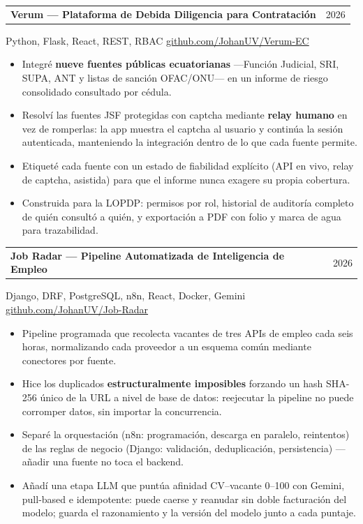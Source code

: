\documentclass[10.5pt,a4paper]{article}
\makeatletter
\newcommand{\entry}[2]{%
  \begin{tabularx}{\linewidth}{@{}Xr@{}}
    \textbf{#1} & {\small\color{soft}#2}
  \end{tabularx}%
  \vspace{0.15em}
}
\newcommand{\subentry}[1]{{\small\color{muted}#1}\vspace{0.25em}}
\newenvironment{points}
  {\begin{itemize}[leftmargin=1.1em, itemsep=0.18em, topsep=0.25em, parsep=0pt, label=\textcolor{soft}{\footnotesize\textbullet}]}
  {\end{itemize}}
\makeatother
\begin{document}
\entry{Verum --- Plataforma de Debida Diligencia para Contratación}{2026}
\subentry{Python, Flask, React, REST, RBAC \textbullet{} \href{https://github.com/JohanUV/Verum-EC}{github.com/JohanUV/Verum-EC}}
\begin{points}
  \item Integré \textbf{nueve fuentes públicas ecuatorianas} ---Función Judicial, SRI, SUPA,
        ANT y listas de sanción OFAC/ONU--- en un informe de riesgo consolidado consultado
        por cédula.
  \item Resolví las fuentes JSF protegidas con captcha mediante \textbf{relay humano} en vez de
        romperlas: la app muestra el captcha al usuario y continúa la sesión autenticada,
        manteniendo la integración dentro de lo que cada fuente permite.
  \item Etiqueté cada fuente con un estado de fiabilidad explícito (API en vivo, relay de
        captcha, asistida) para que el informe nunca exagere su propia cobertura.
  \item Construida para la LOPDP: permisos por rol, historial de auditoría completo de quién
        consultó a quién, y exportación a PDF con folio y marca de agua para trazabilidad.
\end{points}

\entry{Job Radar --- Pipeline Automatizada de Inteligencia de Empleo}{2026}
\subentry{Django, DRF, PostgreSQL, n8n, React, Docker, Gemini \textbullet{} \href{https://github.com/JohanUV/Job-Radar}{github.com/JohanUV/Job-Radar}}
\begin{points}
  \item Pipeline programada que recolecta vacantes de tres APIs de empleo cada seis horas,
        normalizando cada proveedor a un esquema común mediante conectores por fuente.
  \item Hice los duplicados \textbf{estructuralmente imposibles} forzando un hash SHA-256 único
        de la URL a nivel de base de datos: reejecutar la pipeline no puede corromper datos,
        sin importar la concurrencia.
  \item Separé la orquestación (n8n: programación, descarga en paralelo, reintentos) de las
        reglas de negocio (Django: validación, deduplicación, persistencia) --- añadir una fuente
        no toca el backend.
  \item Añadí una etapa LLM que puntúa afinidad CV--vacante 0--100 con Gemini, pull-based e
        idempotente: puede caerse y reanudar sin doble facturación del modelo; guarda el
        razonamiento y la versión del modelo junto a cada puntaje.
\end{points}
\end{document}
